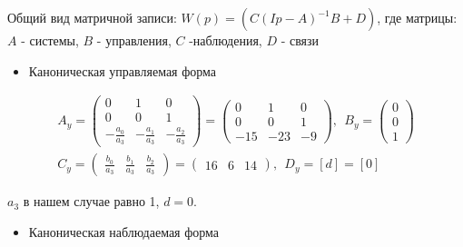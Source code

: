 Общий вид матричной записи: $W(p)=(C(Ip-A)^{-1} B+D)$, где
матрицы: $A$ - системы, $B$ - управления, $C$ -наблюдения, $D$ - связи

\begin{itemize}
\setlength{\itemsep}{-1ex}
   \item{\begin{flushleft} Каноническая управляемая форма \end{flushleft}}
\end{itemize}

\begin{par}
$$\begin{array}{l}
A_y =\left(\begin{array}{ccc}
0 & 1 & 0\\
0 & 0 & 1\\
-\frac{a_0 }{a_3 } & -\frac{a_1 }{a_3 } & -\frac{a_2 }{a_3 }
\end{array}\right)=\left(\begin{array}{ccc}
0 & 1 & 0\\
0 & 0 & 1\\
-15 & -23 & -9
\end{array}\right),~~B_y =\left(\begin{array}{c}
0\\
0\\
1
\end{array}\right)\\
C_y =\left(\begin{array}{ccc}
\frac{b_0 }{a_3 } & \frac{b_1 }{a_3 } & \frac{b_2 }{a_3 }
\end{array}\right)=\left(\begin{array}{ccc}
16 & 6 & 14
\end{array}\right),~~D_y =[d]=[0]
\end{array}$$
\end{par}

\begin{par}
\begin{flushleft}
$a_3$ в нашем случае равно 1, $d=0$.
\end{flushleft}
\end{par}

\begin{itemize}
\setlength{\itemsep}{-1ex}
   \item{\begin{flushleft} Каноническая наблюдаемая форма \end{flushleft}}
\end{itemize}

